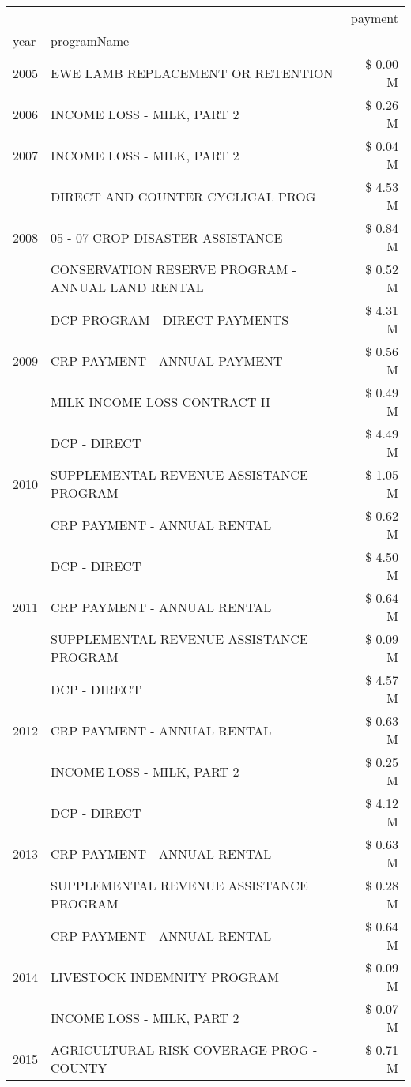 \begin{tabular}{llr}
\toprule
 &  & payment \\
year & programName &  \\
\midrule
2005 & EWE LAMB REPLACEMENT OR RETENTION & \$ 0.00 M \\
\cline{1-3}
2006 & INCOME LOSS - MILK, PART 2 & \$ 0.26 M \\
\cline{1-3}
2007 & INCOME LOSS - MILK, PART 2 & \$ 0.04 M \\
\cline{1-3}
\multirow[t]{3}{*}{2008} & DIRECT AND COUNTER CYCLICAL PROG & \$ 4.53 M \\
 & 05 - 07 CROP DISASTER ASSISTANCE & \$ 0.84 M \\
 & CONSERVATION RESERVE PROGRAM - ANNUAL LAND RENTAL & \$ 0.52 M \\
\cline{1-3}
\multirow[t]{3}{*}{2009} & DCP PROGRAM - DIRECT PAYMENTS & \$ 4.31 M \\
 & CRP PAYMENT - ANNUAL PAYMENT & \$ 0.56 M \\
 & MILK INCOME LOSS CONTRACT II & \$ 0.49 M \\
\cline{1-3}
\multirow[t]{3}{*}{2010} & DCP - DIRECT & \$ 4.49 M \\
 & SUPPLEMENTAL REVENUE ASSISTANCE PROGRAM & \$ 1.05 M \\
 & CRP PAYMENT - ANNUAL RENTAL & \$ 0.62 M \\
\cline{1-3}
\multirow[t]{3}{*}{2011} & DCP - DIRECT & \$ 4.50 M \\
 & CRP PAYMENT - ANNUAL RENTAL & \$ 0.64 M \\
 & SUPPLEMENTAL REVENUE ASSISTANCE PROGRAM & \$ 0.09 M \\
\cline{1-3}
\multirow[t]{3}{*}{2012} & DCP - DIRECT & \$ 4.57 M \\
 & CRP PAYMENT - ANNUAL RENTAL & \$ 0.63 M \\
 & INCOME LOSS - MILK, PART 2 & \$ 0.25 M \\
\cline{1-3}
\multirow[t]{3}{*}{2013} & DCP - DIRECT & \$ 4.12 M \\
 & CRP PAYMENT - ANNUAL RENTAL & \$ 0.63 M \\
 & SUPPLEMENTAL REVENUE ASSISTANCE PROGRAM & \$ 0.28 M \\
\cline{1-3}
\multirow[t]{3}{*}{2014} & CRP PAYMENT - ANNUAL RENTAL & \$ 0.64 M \\
 & LIVESTOCK INDEMNITY PROGRAM & \$ 0.09 M \\
 & INCOME LOSS - MILK, PART 2 & \$ 0.07 M \\
\cline{1-3}
\multirow[t]{3}{*}{2015} & AGRICULTURAL RISK COVERAGE PROG - COUNTY & \$ 0.71 M \\

\end{tabular}
